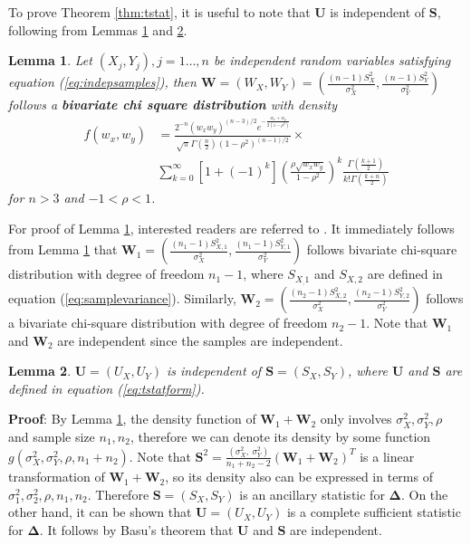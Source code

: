 \documentclass[12pt, a4paper]{article}
\newtheorem{lemma}{Lemma}
\begin{document}
	To prove Theorem \ref{thm:tstat}, it is useful to note that $\bm U$ is independent of $\bm S$,
	following from Lemmas \ref{lemmabiChisq} and \ref{lemmaIndep}.
	\begin{lemma}\label{lemmabiChisq}
		Let $(X_{j}, Y_{j}), j=1 \ldots,  n$ be independent random variables satisfying equation (\ref{eq:indepsamples}),
		then $\bm W = (W_{X},W_{Y}) =(\frac{(n -1)S_{X}^2}{\sigma_X^2}, \frac{(n-1)S_{Y}^2}{\sigma_Y^2})$ 
		follows a \textbf{bivariate chi square distribution} with density 
		\begin{equation}\label{biChisq}
			\begin{aligned}
				f(w_x, w_y) & = \frac{2^{-n}(w_xw_y)^{(n-3)/2}e^{-\frac{w_x +
							w_y}{2(1-\rho^2)}}}{\sqrt{\pi}\Gamma(\frac{n}{2})(1-\rho^2)^{(n-1)/2}} \times \\
				& \sum_{k=0}^{\infty}[1 +
				(-1)^k]\left(\frac{\rho\sqrt{w_xw_y}}{1-\rho^2}\right)^k\frac{\Gamma(\frac{k+1}{2})}{k!\Gamma(\frac{k
						+ n}{2})}
			\end{aligned}
		\end{equation}
		for $n>3$ and $-1<\rho < 1$.
	\end{lemma}
	For proof of Lemma \ref{lemmabiChisq}, interested readers are referred to \citet{joarder2009moments}.
	It immediately follows from Lemma \ref{lemmabiChisq} that $\bm W_1 = (\frac{(n_1 -1)S_{X, 1}^2}{\sigma_X^2}, \frac{(n_1-1)S_{Y, 1}^2}{\sigma_Y^2})$ follows bivariate chi-square distribution with degree of freedom $n_1-1$, where $S_{X_,1}$ and $S_{X, 2}$ are defined in equation (\ref{eq:samplevariance}). Similarly, $\bm W_2 =(\frac{(n_2 -1)S_{X, 2}^2}{\sigma_X^2}, \frac{(n_2-1)S_{Y, 2}^2}{\sigma_Y^2})$ follows a bivariate chi-square distribution with degree of freedom $n_2-1$.  Note that $\bm W_1$ and $\bm W_2$ are independent since the samples are independent. 
	
	\begin{lemma}\label{lemmaIndep}
		$\bm U =(U_X, U_Y)$ is independent of $\bm S = (S_X ,S_Y)$, where $\bm U$ and $\bm S$ are defined in
		equation (\ref{eq:tstatform}).
	\end{lemma}
	\textbf{Proof}: By Lemma \ref{lemmabiChisq}, the density function of $
	\bm W_1 + \bm W_2$ only involves $\sigma^2_X, \sigma^2_Y, \rho$ and sample size $n_1, n_2$, therefore
	we can denote its density by some function $g(\sigma^2_X, \sigma^2_Y, \rho,
	n_1 + n_2)$. Note that $\bm S^2 = \frac{(\sigma_X^2, ~\sigma^2_Y)}{n_1 +n_2 -2}(\bm W_1 + \bm W_2)^T $
	is a linear transformation of $\bm W_1 + \bm W_2$, so its density also can be expressed in terms of $\sigma^2_1, \sigma^2_2, \rho, n_1, n_2$. Therefore $\bm S = (S_X ,S_Y)$ is an ancillary statistic for $\bm \Delta$. On the other hand, it can
	be shown that $\bm U =(U_X, U_Y)$ is a complete sufficient statistic for $\bm \Delta$. It follows by
	Basu's theorem that $\bm U$ and $\bm S$ are independent. 
	
\end{document}
